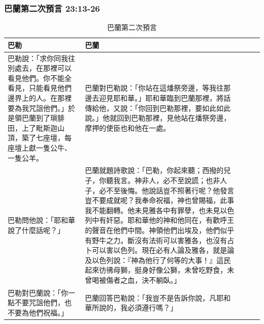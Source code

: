 \subsubsection{巴蘭第二次預言 23:13-26}
\begin{table}[H]
\begin{tabular}{@{}p{}*{4}{L{\tabcolsep\relax}}@{}}
\toprule
巴勒&巴蘭 \\\hline
巴勒說：「求你同我往別處去，在那裡可以看見他們。你不能全看見，只能看見他們邊界上的人。在那裡要為我咒詛他們。」於是領巴蘭到了瑣腓田，上了毗斯迦山頂，築了七座壇，每座壇上獻一隻公牛、一隻公羊。&巴蘭對巴勒說：「你站在這燔祭旁邊，等我往那邊去迎見耶和華。」耶和華臨到巴蘭那裡，將話傳給他，又說：「你回到巴勒那裡，要如此如此說。」他就回到巴勒那裡，見他站在燔祭旁邊，摩押的使臣也和他在一處。\\\hline
巴勒問他說：「耶和華說了什麼話呢？」&巴蘭就題詩歌說：「巴勒，你起來聽；西撥的兒子，你聽我言。神非人，必不至說謊；也非人子，必不至後悔。他說話豈不照著行呢？他發言豈不要成就呢？我奉命祝福，神也曾賜福，此事我不能翻轉。他未見雅各中有罪孽，也未見以色列中有奸惡。耶和華他的神和他同在，有歡呼王的聲音在他們中間。神領他們出埃及，他們似乎有野牛之力。斷沒有法術可以害雅各，也沒有占卜可以害以色列。現在必有人論及雅各，就是論及以色列說：『神為他行了何等的大事！』這民起來彷彿母獅，挺身好像公獅，未曾吃野食，未曾喝被傷者之血，決不躺臥。」\\\hline
巴勒對巴蘭說：「你一點不要咒詛他們，也不要為他們祝福。」&巴蘭回答巴勒說：「我豈不是告訴你說，凡耶和華所說的，我必須遵行嗎？」\\\hline
\bottomrule
\end{tabular}
\caption{巴蘭第二次預言}
\end{table} 


